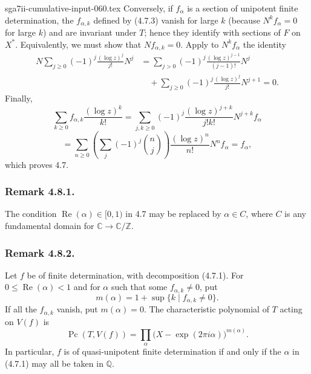 \begin{filecontents*}{sga7ii-cumulative-input-060.tex}
Conversely, if $f_\alpha$ is a section of unipotent finite
determination, the $f_{\alpha,k}$ defined by (4.7.3) vanish for large
$k$ (because $N^k f_\alpha=0$ for large $k$) and are invariant under
$T$; hence they identify with sections of $F$ on $X^*$.  Equivalently,
we must show that $Nf_{\alpha,k}=0$.  Apply to $N^k f_\alpha$ the
identity
\[
\begin{aligned}
N\sum_{j\geq0}(-1)^j\frac{(\log z)^j}{j!}N^j
&=\sum_{j>0}(-1)^j\frac{(\log z)^{j-1}}{(j-1)!}N^j\\
&\quad+\sum_{j\geq0}(-1)^j\frac{(\log z)^j}{j!}N^{j+1}=0.
\end{aligned}
\]
Finally,
\[
\sum_{k\geq0}f_{\alpha,k}\frac{(\log z)^k}{k!}
=\sum_{j,k\geq0}(-1)^j
 \frac{(\log z)^{j+k}}{j!k!}N^{j+k}f_\alpha
\]
\[
=\sum_{n\geq0}
 \left(\sum_j(-1)^j\binom nj\right)
 \frac{(\log z)^n}{n!}N^n f_\alpha
=f_\alpha,
\]
which proves 4.7.

\subsubsection*{Remark 4.8.1.}
The condition $\operatorname{Re}(\alpha)\in[0,1)$ in 4.7 may be
replaced by $\alpha\in C$, where $C$ is any fundamental domain for
$\mathbb C\longrightarrow\mathbb C/\mathbb Z$.

\subsubsection*{Remark 4.8.2.}
Let $f$ be of finite determination, with decomposition (4.7.1).  For
$0\leq\operatorname{Re}(\alpha)<1$ and for $\alpha$ such that some
$f_{\alpha,k}\ne0$, put
\[
m(\alpha)=1+\sup\{k\mid f_{\alpha,k}\ne0\}.
\]
If all the $f_{\alpha,k}$ vanish, put $m(\alpha)=0$.  The
characteristic polynomial of $T$ acting on $V(f)$ is
\[
\operatorname{Pc}(T,V(f))
=\prod_\alpha\bigl(X-\exp(2\pi i\alpha)\bigr)^{m(\alpha)}.
\]
In particular, $f$ is of quasi-unipotent finite determination if and
only if the $\alpha$ in (4.7.1) may all be taken in $\mathbb Q$.
\end{filecontents*}
